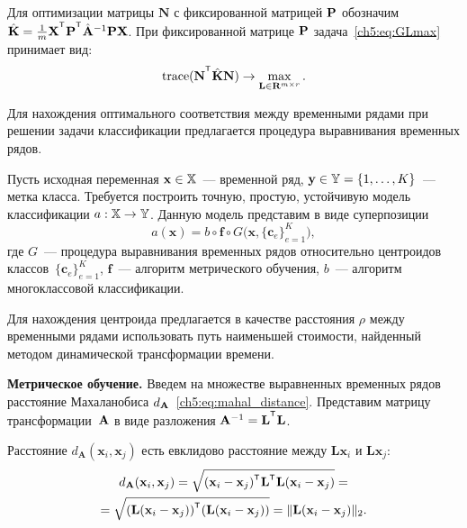 \documentclass[11pt, a5paper]{dissert}
\begin{document}
Для оптимизации матрицы $\mathbf{N}$ с фиксированной матрицей $\mathbf{P}$ обозначим $\hat{\mathbf{K}} = \frac{1}{m}\bX^{\T} \bP^{\T} \hat{\mathbf{A}}^{-1} \bP \bX$.
При фиксированной матрице $\mathbf{P}$ задача~\eqref{ch5:eq:GLmax} принимает вид:
\begin{equation*}
	\text{trace} (\mathbf{N}^{\T} \hat{\mathbf{K}} \mathbf{N}) \to \max_{\mathbf{L} \in \bR^{m \times r}}.
\end{equation*}

Для нахождения оптимального соответствия между временными рядами при решении задачи классификации предлагается процедура выравнивания временных рядов.

Пусть исходная переменная $\mathbf{x} \in \mathbb{X}$~--- временной ряд, $\mathbf{y} \in \mathbb{Y} = \{1, \dots, K\}$~--- метка класса.
Требуется построить точную, простую, устойчивую модель классификации $a: \mathbb{X} \to \mathbb{Y}$.
Данную модель представим в виде суперпозиции
\begin{equation*}
	a(\mathbf{x}) = b \circ \mathbf{f} \circ G\bigl(\mathbf{x}, \{\mathbf{c}_e\}_{e = 1} ^ K\bigr),
\end{equation*}
где $G$~--- процедура выравнивания временных рядов относительно центроидов классов~$\{\mathbf{c}_e\}_{e = 1} ^ K$, $\mathbf{f}$~--- алгоритм метрического обучения, $b$~--- алгоритм многоклассовой классификации.

Для нахождения центроида предлагается в качестве расстояния $\rho$ между временными рядами использовать путь наименьшей стоимости, найденный методом динамической трансформации времени.

\textbf{Метрическое обучение.}
Введем на множестве выравненных временных рядов расстояние Махаланобиса $d_{\mathbf{A}}$~\ref{ch5:eq:mahal_distance}.
Представим матрицу трансформации~$\mathbf{A}$ в виде разложения $\mathbf{A}^{-1} = \mathbf{L}^{\T}  \mathbf{L}$.

Расстояние $d_\mathbf{A} (\mathbf{x}_i, \mathbf{x}_j)$ есть евклидово расстояние между $\mathbf{Lx}_i$ и $\mathbf{Lx}_j$:
\begin{multline*}
	d_\mathbf{A} (\mathbf{x}_i, \mathbf{x}_j) = \sqrt{(\mathbf{x}_i - \mathbf{x}_j)^{\T} \mathbf{L}^{\T} \mathbf{L} (\mathbf{x}_i - \mathbf{x}_j)} = \\= \sqrt{(\mathbf{L} (\mathbf{x}_i - \mathbf{x}_j))^{\T} (\mathbf{L} (\mathbf{x}_i - \mathbf{x}_j))} = \|\mathbf{L} (\mathbf{x}_i - \mathbf{x}_j)\|_2.
\end{multline*}
\end{document}
